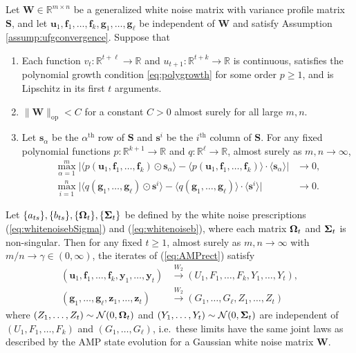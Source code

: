 \documentclass[10pt,reqno]{amsart}
\def\a{\alpha}
\def\s{\mathbf{s}}
\def\u{\mathbf{u}}
\def\y{\mathbf{y}}
\def\z{\mathbf{z}}
\def\f{\mathbf{f}}
\def\g{\mathbf{g}}
\def\W{\mathbf{W}}
\def\S{\mathbf{S}}
\def\R{\mathbb{R}}
\def\op{\mathrm{op}}
\def\Normal{\mathcal{N}}
\def\toWtwo{\overset{W_2}{\to}}
\begin{document}
\begin{theorem}\label{thm:rect}
Let $\W \in \R^{m \times n}$ be a generalized white noise matrix with variance
profile matrix $\S$, and let $\u_1,\f_1,\ldots,\f_k,\g_1,\ldots,\g_\ell$ be independent
of $\W$ and satisfy Assumption \ref{assump:ufgconvergence}. Suppose that
\begin{enumerate}
\item Each function $v_t:\R^{t+\ell} \to \R$ and
$u_{t+1}:\R^{t+k} \to \R$ is continuous, satisfies the 
polynomial growth condition \eqref{eq:polygrowth} for some order $p \geq 1$, 
and is Lipschitz in its first $t$ arguments.
\item $\|\W\|_\op<C$ for a constant $C>0$ almost surely for all large $m,n$.
\item Let $\s_\a$ be the $\a^\text{th}$ row of $\S$ and $\s^i$ be
the $i^\text{th}$ column of $\S$. 
For any fixed polynomial
functions $p:\R^{k+1} \to \R$ and $q:\R^\ell \to \R$, almost surely as $m,n
\to \infty$,
\begin{equation}\label{eq:rectprofileassumption}
\begin{aligned}
\max_{\a=1}^m \Big| \langle p(\u_1,\f_1,\ldots,\f_k) \odot \s_\alpha \rangle
-\langle p(\u_1,\f_1,\ldots,\f_k) \rangle \cdot \langle \s_\alpha \rangle\Big|
&\to 0,\\
\max_{i=1}^n \Big| \langle q(\g_1,\ldots,\g_\ell) \odot \s^i \rangle
-\langle q(\g_1,\ldots,\g_\ell) \rangle \cdot \langle \s^i \rangle\Big| &\to 0.
\end{aligned}
\end{equation}
\end{enumerate}
Let $\{a_{ts}\},\{b_{ts}\},\{\bm{\Omega}_t\},\{\bm{\Sigma}_t\}$ be defined by the
white noise prescriptions
(\ref{eq:whitenoisebSigma}) and (\ref{eq:whitenoiseb}), where
each matrix $\bm{\Omega}_t$ and $\bm{\Sigma}_t$ is non-singular.
Then for any fixed $t \geq 1$, almost surely as $m,n \to \infty$ with $m/n \to
\gamma \in (0,\infty)$, the iterates of (\ref{eq:AMPrect}) satisfy
\begin{align*}
(\u_1,\f_1,\ldots,\f_k,\y_1,\ldots,\y_t) &\toWtwo (U_1,F_1,\ldots,F_k,
Y_1,\ldots,Y_t),\\
(\g_1,\ldots,\g_\ell,\z_1,\ldots,\z_t) &\toWtwo
(G_1,\ldots,G_\ell,Z_1,\ldots,Z_t)
\end{align*}
where $(Z_1,\ldots,Z_t) \sim \Normal(0,\bOmega_t)$ and $(Y_1,\ldots,Y_t) \sim
\Normal(0,\bSigma_t)$ are independent of $(U_1,F_1,\ldots,F_k)$ and
$(G_1,\ldots,G_\ell)$, i.e.\ these limits have the same joint laws as
described by the AMP state evolution for a Gaussian white noise matrix $\W$.
\end{theorem}
\end{document}

